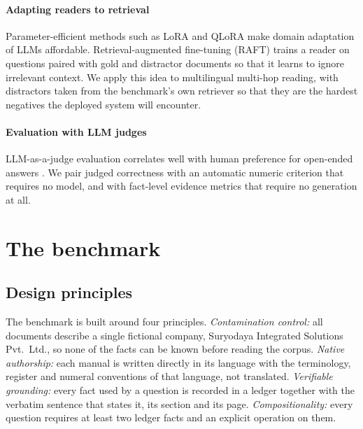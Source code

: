 \documentclass[preprint,12pt]{elsarticle}
\begin{document}
\paragraph{Adapting readers to retrieval}
Parameter-efficient methods such as LoRA \cite{hu2022lora} and QLoRA \cite{dettmers2023qlora} make domain adaptation of LLMs affordable. Retrieval-augmented fine-tuning (RAFT) \cite{zhang2024raft} trains a reader on questions paired with gold and distractor documents so that it learns to ignore irrelevant context. We apply this idea to multilingual multi-hop reading, with distractors taken from the benchmark's own retriever so that they are the hardest negatives the deployed system will encounter.

\paragraph{Evaluation with LLM judges}
LLM-as-a-judge evaluation correlates well with human preference for open-ended answers \cite{zheng2023judge}. We pair judged correctness with an automatic numeric criterion that requires no model, and with fact-level evidence metrics that require no generation at all.

\section{The benchmark}
\label{sec:dataset}

\subsection{Design principles}
The benchmark is built around four principles. \emph{Contamination control:} all documents describe a single fictional company, Suryodaya Integrated Solutions Pvt.\ Ltd., so none of the facts can be known before reading the corpus. \emph{Native authorship:} each manual is written directly in its language with the terminology, register and numeral conventions of that language, not translated. \emph{Verifiable grounding:} every fact used by a question is recorded in a ledger together with the verbatim sentence that states it, its section and its page. \emph{Compositionality:} every question requires at least two ledger facts and an explicit operation on them.
\end{document}
